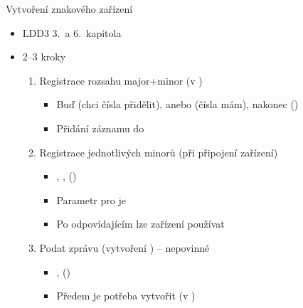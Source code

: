 \begin{frame}[fragile]{Vytvoření znakového zařízení}

  \begin{itemize}
  \item LDD3 3.\ a 6.\ kapitola
  \item 2--3 kroky

  \begin{enumerate}
  \item Registrace rozsahu major+minor (v )
    \begin{itemize}
    \item Buď  (chci čísla přidělit), anebo
       (čísla mám), nakonec
       ()
    \item Přidání záznamu do 
    \end{itemize}

  \pause

  \item Registrace jednotlivých minorů (při připojení zařízení)
    \begin{itemize}
    \item {}, , 
      ()
    \item Parametr pro  je 
    \item Po odpovídajícím  lze zařízení používat
    \end{itemize}

  \pause

  \item Podat zprávu  (vytvoření ) -- nepovinné
    \begin{itemize}
    \item {}, 
      ()
    \item Předem je potřeba vytvořit  (v )
    \end{itemize}
  \end{enumerate}

  \end{itemize}

%

\end{frame}

